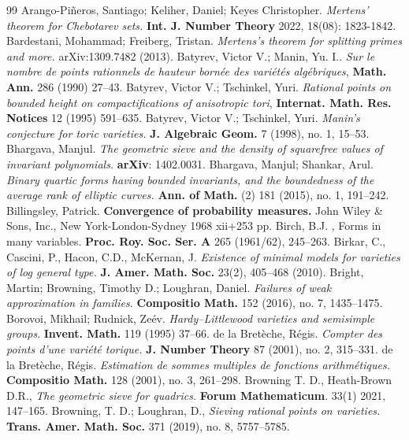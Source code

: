 \documentclass[11pt,letterpaper]{amsart}
\theoremstyle{plain}
\numberwithin{equation}{section}
\theoremstyle{definition}
\theoremstyle{remark}
\begin{document}
\begin{thebibliography}{99}
	 Arango-Piñeros, Santiago; Keliher, Daniel; Keyes Christopher. \emph{Mertens’ theorem for Chebotarev sets.}  \textbf{Int. J. Number Theory} 2022, 18(08): 1823-1842.
	 Bardestani, Mohammad; Freiberg, Tristan. \emph{Mertens's theorem for splitting primes and more.} arXiv:1309.7482 (2013).
	 Batyrev, Victor V.; Manin, Yu. I.. \emph{Sur le nombre de points rationnels de hauteur born\'ee
	des vari\'et\'es alg\'ebriques}, \textbf{Math. Ann.} 286 (1990) 27–43.
	 Batyrev, Victor V.; Tschinkel, Yuri. \emph{Rational points on bounded height on compactifications of anisotropic tori}, \textbf{Internat. Math. Res. Notices} 12 (1995) 591–635.
	 Batyrev, Victor V.; Tschinkel, Yuri. \emph{Manin's conjecture for toric varieties.} \textbf{J. Algebraic Geom.} 7 (1998), no. 1, 15–53.
	  Bhargava, Manjul. \emph{The geometric sieve and the density of squarefree values of invariant polynomials.} \textbf{arXiv}: 1402.0031.
	 Bhargava, Manjul; Shankar, Arul. \emph{Binary quartic forms having bounded invariants, and the boundedness of the average rank of elliptic curves.} \textbf{Ann. of Math.} (2) 181 (2015), no. 1, 191–242.
	 Billingsley, Patrick. \textbf{Convergence of probability measures.} John Wiley \& Sons, Inc., New York-London-Sydney 1968 xii+253 pp.
	 Birch, B.J. , Forms in many variables. \textbf{Proc. Roy. Soc. Ser. A} 265 (1961/62), 245–263.
	 Birkar, C., Cascini, P., Hacon, C.D., McKernan, J. \emph{Existence of minimal models for varieties of log general type.} \textbf{J. Amer. Math. Soc.} 23(2), 405–468 (2010).
	 Bright, Martin; Browning, Timothy D.; Loughran, Daniel.
	\emph{Failures of weak approximation in families.} \textbf{Compositio Math.} 152 (2016), no. 7, 1435–1475.
	Borovoi, Mikhail; Rudnick, Zeév. \emph{Hardy–Littlewood varieties and semisimple groups}. \textbf{Invent. Math.} 119 (1995) 37–66.
	 de la Bretèche, Régis. \emph{Compter des points d'une variété torique.} \textbf{J. Number Theory} 87 (2001), no. 2, 315–331. 
	 de la Bretèche, Régis. \emph{Estimation de sommes multiples de fonctions arithmétiques.} \textbf{Compositio Math.} 128 (2001), no. 3, 261–298.
	 Browning T. D., Heath-Brown D.R., \emph{The geometric sieve for quadrics.} \textbf{Forum Mathematicum}. 33(1) 2021, 147–165.
	 Browning, T. D.; Loughran, D., \emph{Sieving rational points on varieties.} \textbf{Trans. Amer. Math. Soc.} 371 (2019), no. 8, 5757–5785.

\end{thebibliography}
\end{document}
